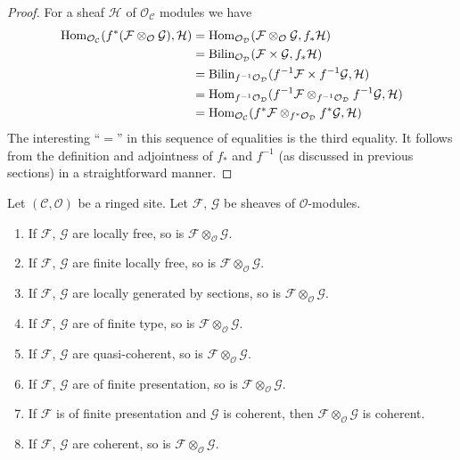 \begin{proof}
For a sheaf $\mathcal{H}$ of $\mathcal{O}_\mathcal{C}$ modules we
have
\begin{align*}
\mathop{\rm Hom}\nolimits_{\mathcal{O}_\mathcal{C}}(
f^*(\mathcal{F} \otimes_\mathcal{O} \mathcal{G}), \mathcal{H})
& =
\mathop{\rm Hom}\nolimits_{\mathcal{O}_\mathcal{D}}(
\mathcal{F} \otimes_\mathcal{O} \mathcal{G}, f_*\mathcal{H}) \\
& =
\text{Bilin}_{\mathcal{O}_\mathcal{D}}(
\mathcal{F} \times \mathcal{G}, f_*\mathcal{H}) \\
& =
\text{Bilin}_{f^{-1}\mathcal{O}_\mathcal{D}}(
f^{-1}\mathcal{F} \times f^{-1}\mathcal{G}, \mathcal{H}) \\
& =
\mathop{\rm Hom}\nolimits_{f^{-1}\mathcal{O}_\mathcal{D}}(
f^{-1}\mathcal{F} \otimes_{f^{-1}\mathcal{O}_\mathcal{D}} f^{-1}\mathcal{G},
\mathcal{H}) \\
& =
\mathop{\rm Hom}\nolimits_{\mathcal{O}_\mathcal{C}}(
f^*\mathcal{F} \otimes_{f^*\mathcal{O}_\mathcal{D}} f^*\mathcal{G},
\mathcal{H})
\end{align*}
The interesting ``$=$'' in this sequence of equalities is the
third equality. It follows from the definition and adjointness of
$f_*$ and $f^{-1}$ (as discussed in previous sections) in a
straightforward manner.
\end{proof}

\begin{lemma}
\label{lemma-tensor-product-permanence}
Let $(\mathcal{C}, \mathcal{O})$ be a ringed site.
Let $\mathcal{F}$, $\mathcal{G}$ be sheaves of $\mathcal{O}$-modules.
\begin{enumerate}
\item If $\mathcal{F}$, $\mathcal{G}$ are locally free,
so is $\mathcal{F} \otimes_\mathcal{O} \mathcal{G}$.
\item If $\mathcal{F}$, $\mathcal{G}$ are finite locally free,
so is $\mathcal{F} \otimes_\mathcal{O} \mathcal{G}$.
\item If $\mathcal{F}$, $\mathcal{G}$ are locally generated
by sections, so is $\mathcal{F} \otimes_\mathcal{O} \mathcal{G}$.
\item If $\mathcal{F}$, $\mathcal{G}$ are of finite type,
so is $\mathcal{F} \otimes_\mathcal{O} \mathcal{G}$.
\item If $\mathcal{F}$, $\mathcal{G}$ are quasi-coherent,
so is $\mathcal{F} \otimes_\mathcal{O} \mathcal{G}$.
\item If $\mathcal{F}$, $\mathcal{G}$ are of finite presentation,
so is $\mathcal{F} \otimes_\mathcal{O} \mathcal{G}$.
\item If $\mathcal{F}$ is of finite presentation and $\mathcal{G}$ is coherent,
then $\mathcal{F} \otimes_\mathcal{O} \mathcal{G}$ is coherent.
\item If $\mathcal{F}$, $\mathcal{G}$ are coherent,
so is $\mathcal{F} \otimes_\mathcal{O} \mathcal{G}$.
\end{enumerate}
\end{lemma}

